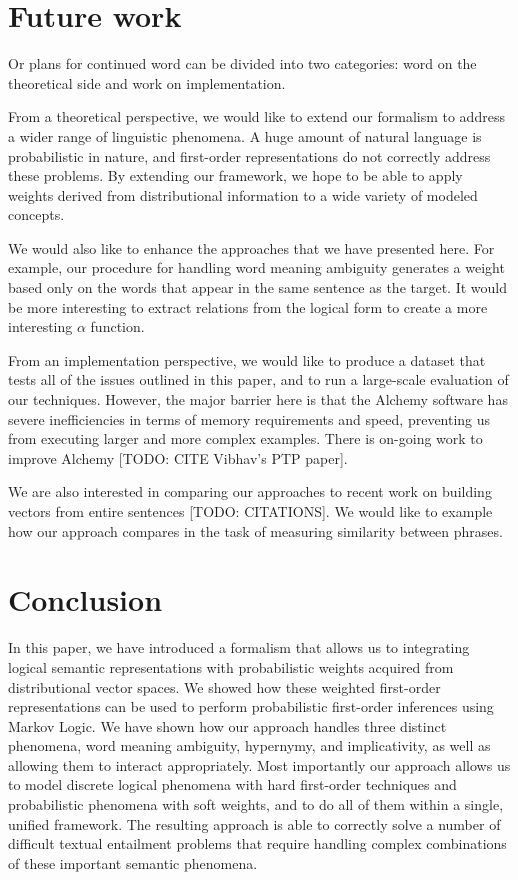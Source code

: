 \section{Future work}

Or plans for continued word can be divided into two categories: word on the
theoretical side and work on implementation.

From a theoretical perspective, we would like to extend our formalism to address
a wider range of linguistic phenomena.  A huge amount of natural language is
probabilistic in nature, and first-order representations do not correctly
address these problems.  By extending our framework, we hope to be able to
apply weights derived from distributional information to a wide variety of
modeled concepts.

We would also like to enhance the approaches that we have presented here.  For
example, our procedure for handling word meaning ambiguity generates a weight
based only on the words that appear in the same sentence as the target.  It
would be more interesting to extract relations from the logical form to create a
more interesting $\alpha$ function.


From an implementation perspective, we would like to produce a dataset that
tests all of the issues outlined in this paper, and to run a large-scale
evaluation of our techniques.  
However, the major barrier here is that the Alchemy software has severe
inefficiencies in terms of memory requirements and speed, preventing us
from executing larger and more complex examples.  There is on-going
work to improve Alchemy [TODO: CITE Vibhav's PTP paper].

We are also interested in comparing our approaches to recent work on building
vectors from entire sentences [TODO: CITATIONS].  We would like to example
how our approach compares in the task of measuring similarity between
phrases.


\section{Conclusion}

In this paper, we have introduced a formalism that allows us to integrating
logical semantic representations with probabilistic weights acquired from
distributional vector spaces.  We showed how these weighted first-order
representations can be used to perform probabilistic first-order inferences
using Markov Logic.  We have shown how our approach handles three distinct
phenomena, word meaning ambiguity, hypernymy, and implicativity, as well as
allowing them to interact appropriately.  Most importantly our approach allows 
us to model discrete logical phenomena with hard first-order techniques and
probabilistic phenomena with soft weights, and to do all of them within a
single, unified framework.
The resulting approach is able to correctly solve a number of difficult
textual entailment problems that require handling complex combinations of these
important semantic phenomena.

